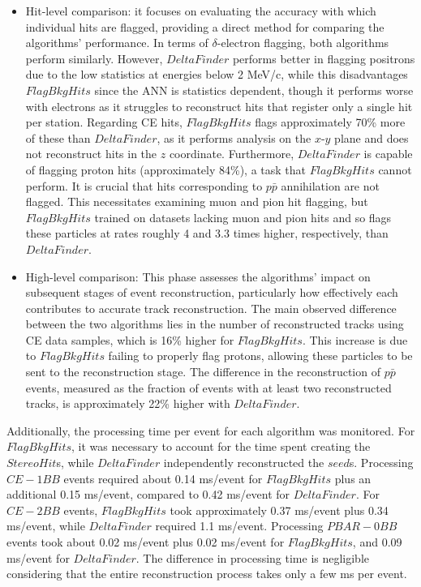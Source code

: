 \begin{itemize}
    \item Hit-level comparison: it focuses on evaluating the 
    accuracy with which individual hits are flagged, providing a 
    direct method for comparing the algorithms' performance. In terms 
    of $\delta$-electron flagging, both algorithms perform similarly. 
    However, $DeltaFinder$ performs better in flagging positrons 
    due to the low statistics at energies below 2 MeV/c, 
    while this disadvantages $FlagBkgHits$ since the ANN is 
    statistics dependent, though it 
    performs worse with electrons as it struggles to reconstruct hits 
    that register only a single hit per station. Regarding CE hits, 
    $FlagBkgHits$ flags approximately 70\% more of these than 
    $DeltaFinder$, as it performs analysis on the $x$-$y$ plane and does 
    not reconstruct hits in the $z$ coordinate. Furthermore, 
    $DeltaFinder$ is capable of flagging proton hits (approximately 84\%), 
    a task that $FlagBkgHits$ cannot perform. It is crucial that hits 
    corresponding to $p\bar{p}$ annihilation are not flagged. This necessitates 
    examining muon and pion hit flagging, but $FlagBkgHits$ trained 
    on datasets lacking muon and pion hits and so 
    flags these particles at rates roughly 4 and 3.3 times higher, 
    respectively, than $DeltaFinder$.
    
    \item High-level comparison: This phase assesses the algorithms' 
    impact on subsequent stages of event reconstruction, particularly 
    how effectively each contributes to accurate track reconstruction. 
    The main observed difference between the two algorithms lies in the number 
    of reconstructed tracks using CE data samples, which is 16\% higher 
    for $FlagBkgHits$. This increase is due to $FlagBkgHits$ failing to 
    properly flag protons, allowing these particles to be sent to the 
    reconstruction stage. The difference in the reconstruction of 
    $p\bar{p}$ events, measured as the fraction of events with 
    at least two reconstructed tracks, is approximately 22\% higher with $DeltaFinder$.
\end{itemize}

Additionally, the processing time per event for each algorithm was 
monitored. For $FlagBkgHits$, it was necessary to account for the time 
spent creating the $StereoHit$s, while $DeltaFinder$ independently 
reconstructed the $seed$s. Processing $CE-1BB$ events required about 
0.14 ms/event for $FlagBkgHits$ plus an additional 0.15 ms/event, 
compared to 0.42 ms/event for $DeltaFinder$. For $CE-2BB$ events, 
$FlagBkgHits$ took approximately 0.37 ms/event plus 0.34 ms/event, 
while $DeltaFinder$ required 1.1 ms/event. Processing $PBAR-0BB$ 
events took about 0.02 ms/event plus 0.02 ms/event for $FlagBkgHits$, 
and 0.09 ms/event for $DeltaFinder$. The difference in processing time 
is negligible considering that the entire reconstruction process 
takes only a few ms per event.

